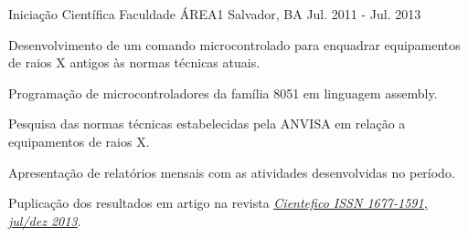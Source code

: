 \begin{cventries}
  \cventry
    {Iniciação Científica} %
    {Faculdade ÁREA1} %
    {Salvador, BA} %
    {Jul. 2011 - Jul. 2013} %
    {
      \begin{cvitems} %
        \item {Desenvolvimento de um comando microcontrolado para enquadrar equipamentos de raios X antigos às normas técnicas atuais.}
        \item {Programação de microcontroladores da família 8051 em linguagem assembly.}
        \item {Pesquisa das normas técnicas estabelecidas pela ANVISA em relação a equipamentos de raios X.}
        \item {Apresentação de relatórios mensais com as atividades desenvolvidas no período.}
        \item {Puplicação dos resultados em artigo na revista \underline{\href{https://cientefico.emnuvens.com.br/cientefico/article/view/58}{\emph{Cientefico ISSN 1677-1591, jul/dez 2013}}}.}
      \end{cvitems}
    }
    

\end{cventries}

